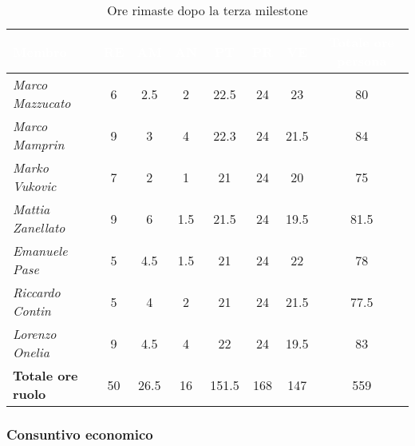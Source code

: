 \begin{table}[H]
    \renewcommand\arraystretch{1.5}
    \centering
    \begin{tabular}{|l|c|c|c|c|c|c|c|}
    \hline
    \rowcolor[HTML]{036400}
    \textcolor{white}{\textbf{Membro}} & \multicolumn{1}{c|}{\textcolor{white}{\textbf{RE}}} & \multicolumn{1}{c|}{\textcolor{white}{\textbf{AM}}} & \multicolumn{1}{c|}{\textcolor{white}{\textbf{AN}}} & \multicolumn{1}{c|}{\textcolor{white}{\textbf{PT}}} & \multicolumn{1}{c|}{\textcolor{white}{\textbf{PR}}} & \multicolumn{1}{c|}{\textcolor{white}{\textbf{VE}}} & \multicolumn{1}{c|}{\textcolor{white}{\textbf{Totale ore persona}}} \\ \hline
    \rowcolor[HTML]{EFEFEF}\textit{Marco Mazzucato}  & 6  & 2.5  & 2    & 22.5  & 24  & 23     & 80     \\ \hline
    \rowcolor[HTML]{C0C0C0}\textit{Marco Mamprin}    & 9  & 3    & 4    & 22.3  & 24  & 21.5   & 84     \\ \hline
    \rowcolor[HTML]{EFEFEF}\textit{Marko Vukovic}    & 7  & 2    & 1    & 21    & 24  & 20     & 75     \\ \hline
    \rowcolor[HTML]{C0C0C0}\textit{Mattia Zanellato} & 9  & 6    & 1.5  & 21.5  & 24  & 19.5   & 81.5   \\ \hline
    \rowcolor[HTML]{EFEFEF}\textit{Emanuele Pase}    & 5  & 4.5  & 1.5  & 21    & 24  & 22     & 78     \\ \hline
    \rowcolor[HTML]{C0C0C0}\textit{Riccardo Contin}  & 5  & 4    & 2    & 21    & 24  & 21.5   & 77.5   \\ \hline
    \rowcolor[HTML]{EFEFEF}\textit{Lorenzo Onelia}   & 9  & 4.5  & 4    & 22    & 24  & 19.5   & 83     \\ \hline
    \rowcolor[HTML]{C0C0C0}\textbf{Totale ore ruolo} & 50 & 26.5 & 16   & 151.5 & 168 & 147    & 559    \\ \hline
    \end{tabular}
    \caption{Ore rimaste dopo la terza milestone}
\end{table}

\subsubsection{Consuntivo economico}

